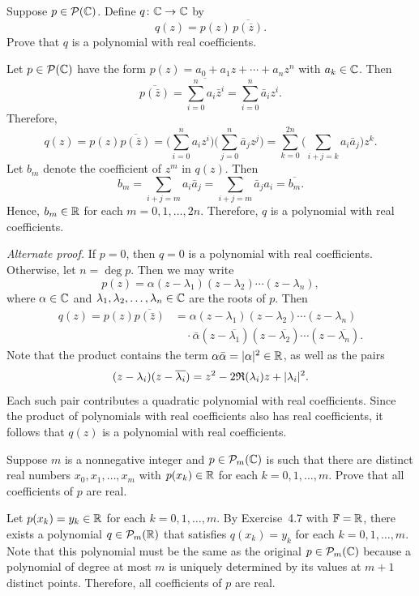 \begin{exercise}
Suppose $p\in\mathcal{P}(\mathbb{C})$. Define $q\colon\mathbb{C}\to\mathbb{C}$ by
\[ q(z) = p(z)\,\overline{p(\overline{z})}. \]
Prove that $q$ is a polynomial with real coefficients.
\end{exercise}
\begin{solution}
Let $p\in\mathcal{P}(\mathbb{C})$ have the form $p(z)=a_0+a_1z+\cdots+a_nz^n$ with
$a_k\in\mathbb{C}$. Then
\[ \overline{p(\bar{z})}=\overline{\sum_{i=0}^{n}a_i\bar{z}^i}
   =\sum_{i=0}^{n}\bar{a}_iz^i. \]
Therefore,
\[ q(z)=p(z)\overline{p(\bar{z})}
   =\biggl(\sum_{i=0}^{n}a_iz^i\biggr)\biggl(\sum_{j=0}^{n}\bar{a}_jz^j\biggr)
   =\sum_{k=0}^{2n}\biggl(\sum_{i+j=k}a_i\bar{a}_j\biggr)z^k. \]
Let $b_m$ denote the coefficient of $z^m$ in $q(z)$. Then
\[ b_m=\sum_{i+j=m}a_i\bar{a}_j=\sum_{i+j=m}\bar{a}_ja_i=\overline{b_m}. \]
Hence, $b_m\in\mathbb{R}$ for each $m=0,1,\dots,2n$. Therefore, $q$ is a polynomial
with real coefficients.

\emph{Alternate proof.} If $p=0$, then $q=0$ is a polynomial with real
coefficients. Otherwise, let $n=\deg p$. Then we may write
\[ p(z)=\alpha(z-\lambda_1)(z-\lambda_2)\cdots(z-\lambda_n), \]
where $\alpha\in\mathbb{C}$ and $\lambda_1,\lambda_2,\dots,\lambda_n\in\mathbb{C}$ are the
roots of $p$. Then
\begin{align*}
q(z)=p(z)\overline{p(\bar{z})}
  &=\alpha(z-\lambda_1)(z-\lambda_2)\cdots(z-\lambda_n)\\
  &\quad\cdot\bar{\alpha}(z-\overline{\lambda_1})(z-\overline{\lambda_2})
    \cdots(z-\overline{\lambda_n}).
\end{align*}
Note that the product contains the term $\alpha\bar{\alpha}=\lvert \alpha \rvert^2\in\mathbb{R}$,
as well as the pairs
\[ (z-\lambda_i)(z-\overline{\lambda_i})=z^2-2\mathfrak{R}(\lambda_i)z
   +\lvert \lambda_i \rvert^2. \]
Each such pair contributes a quadratic polynomial with real coefficients. Since
the product of polynomials with real coefficients also has real coefficients,
it follows that $q(z)$ is a polynomial with real coefficients.
\end{solution}

\begin{exercise}
Suppose $m$ is a nonnegative integer and $p\in\mathcal{P}_m(\mathbb{C})$ is such that there
are distinct real numbers $x_0,x_1,\dots,x_m$ with $p(x_k)\in\mathbb{R}$ for each
$k=0,1,\dots,m$. Prove that all coefficients of $p$ are real.
\end{exercise}
\begin{solution}
Let $p(x_k)=y_k\in\mathbb{R}$ for each $k=0,1,\dots,m$. By Exercise~4.7 with $\mathbb{F}=\mathbb{R}$,
there exists a polynomial $q\in\mathcal{P}_m(\mathbb{R})$ that satisfies $q(x_k)=y_k$ for
each $k=0,1,\dots,m$. Note that this polynomial must be the same as the
original $p\in\mathcal{P}_m(\mathbb{C})$ because a polynomial of degree at most $m$ is
uniquely determined by its values at $m+1$ distinct points. Therefore, all
coefficients of $p$ are real.
\end{solution}

